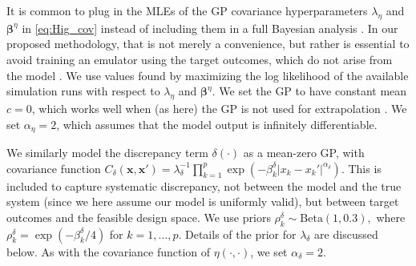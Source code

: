 \documentclass[12pt]{article}
\begin{document}
%
It is common to plug in the MLEs of the GP covariance hyperparameters $\lambda_\eta$ and $\boldsymbol \beta^\eta$ in \eqref{eq:Hig_cov} instead of including them in a full Bayesian analysis \citep{Kennedy2001,Santner2003a,Qian2008,Paulo2012}.
%
In our proposed methodology, that is not merely a convenience, but rather is essential
%
%
%
%
to avoid training an emulator using the target outcomes, which do not arise from the model \citep[see][on the dangers that arise here]{Liu2009}.
%
We use values found by maximizing the log likelihood of the available simulation runs with respect to $\lambda_\eta$ and $\boldsymbol\beta^\eta$.
%
We set the GP to have constant mean $c=0$, which works well when (as here) the GP is not used for extrapolation \citep{Bayarri2007}.
%
We set $\alpha_\eta = 2$, which assumes that the model output is infinitely differentiable.
%

%
We similarly model the discrepancy term $\delta(\cdot)$ as a mean-zero GP, with covariance function
%
$C_\delta(\mathbf x,\mathbf x') = \lambda_\delta^{-1} \prod_{k=1}^p
\exp\left( -\beta_k^\delta |x_k-x_k'|^{\alpha_\delta} \right).$
%
This is included to capture systematic discrepancy, not between the model and the true system (since we here assume our model is uniformly valid), but between target outcomes and the feasible design space.
%
We use priors
$\rho^\delta_k \sim \mathrm{Beta}(1,0.3),$
where $\rho_k^\delta = \exp(-\beta_k^\delta/4)$ for $k=1,\ldots,p$.
%
%
%
Details of the prior for $\lambda_\delta$ are discussed below.
%
As with the covariance function of $\eta(\cdot,\cdot)$, we set $\alpha_\delta=2$.
%
\end{document}
